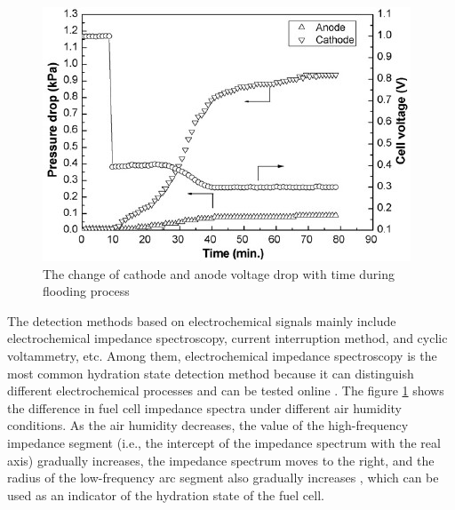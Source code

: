 \begin{figure}[h]
	\centering

	\includegraphics{Research_pictures/Fig1.jpg}
	\caption[short]{The change of cathode and anode voltage drop with time during flooding process}
	\label{fig:figure1}
\end{figure}
The detection methods based on electrochemical signals mainly include electrochemical impedance spectroscopy, current interruption method, and cyclic voltammetry, etc. Among them, electrochemical impedance spectroscopy is the most common hydration state detection method because it can distinguish different electrochemical processes and can be tested online \cite{yousfisteinerDiagnosisPolymerElectrolyte2011,chenOperationCharacteristicsCarbon2015}. The figure \ref{fig:figure1} shows the difference in fuel cell impedance spectra under different air humidity conditions. As the air humidity decreases, the value of the high-frequency impedance segment (i.e., the intercept of the impedance spectrum with the real axis) gradually increases, the impedance spectrum moves to the right, and the radius of the low-frequency arc segment also gradually increases \cite{hussainiVisualizationQuantificationCathode2009}, which can be used as an indicator of the hydration state of the fuel cell.

